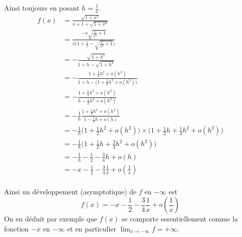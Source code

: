 {{Ainsi toujours en posant $h=\frac1x$.
\begin{align*}
f(x) 
  & = \frac{\sqrt{1+x^2}}{x+1+\sqrt{1+x^2}} \\
  & = \frac{-x\sqrt{\frac{1}{x^2}+1}}{x\big(1+\frac1x-\sqrt{\frac{1}{x^2}+1}\big)} \\
  & = -\frac{\sqrt{1+h^2}}{1+h-\sqrt{1+h^2}} \\
  & = -\frac{1+\frac12 h^2 + o(h^2)}{1+h - \big(1+\frac12 h^2 + o(h^2) \big)} \\
  & = - \frac{1+\frac12 h^2 + o(h^2)}{h  - \frac12 h^2 + o(h^2)} \\
  & = -\frac1h \frac{1+\frac12 h^2 + o(h^2)}{1 - \frac12 h + o(h)} \\
  & = -\frac1h \big(1+\frac12 h^2 + o(h^2)\big)\times\big(1+\frac12h +\frac14 h^2 + o(h^2) \big) \\
  & = -\frac1h\big(1 +\frac12h +\frac34 h^2 + o(h^2) \big) \\
  & =  -\frac1h -\frac12 -\frac34 h + o(h) \\
  & = -x -\frac12 -\frac34 \frac1x + o(\frac1x) \\
\end{align*}  

Ainsi un développement (asymptotique) de $f$ en $-\infty$ est 
$$f(x) = -x -\frac12 -\frac34 \frac1x + o(\frac1x)$$
On en déduit par exemple que $f(x)$ se comporte essentiellement comme la fonction $-x$
en $-\infty$ et en particulier $\lim_{x\to -\infty} f = +\infty$.
}
}
